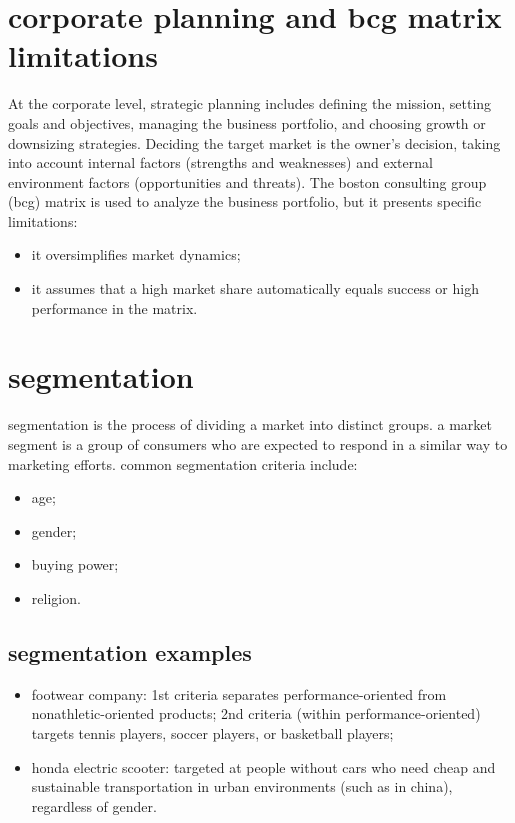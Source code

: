 \documentclass[12pt,a4paper]{report}
\begin{document}
\section{corporate planning and bcg matrix limitations}
At the corporate level, strategic planning includes defining the mission, setting goals and objectives, managing the business portfolio, and choosing growth or downsizing strategies.
 Deciding the target market is the owner's decision, taking into account internal factors (strengths and weaknesses) and external environment factors (opportunities and threats).
The boston consulting group (bcg) matrix is used to analyze the business portfolio, but it presents specific limitations:
\begin{itemize}
\item it oversimplifies market dynamics;
\item it assumes that a high market share automatically equals success or high performance in the matrix.
\end{itemize}   
\section{segmentation}
segmentation is the process of dividing a market into distinct groups. a market segment is a group of consumers who are expected to respond in a similar way to marketing efforts.
common segmentation criteria include:
\begin{itemize}
\item age;
\item gender;
\item buying power;
\item religion.
\end{itemize}   
\subsection{segmentation examples}
\begin{itemize}
\item footwear company: 1st criteria separates performance-oriented from nonathletic-oriented products; 2nd criteria (within performance-oriented) targets tennis players, soccer players, or basketball players;
\item honda electric scooter: targeted at people without cars who need cheap and sustainable transportation in urban environments (such as in china), regardless of gender.
\end{itemize}   
\end{document}
